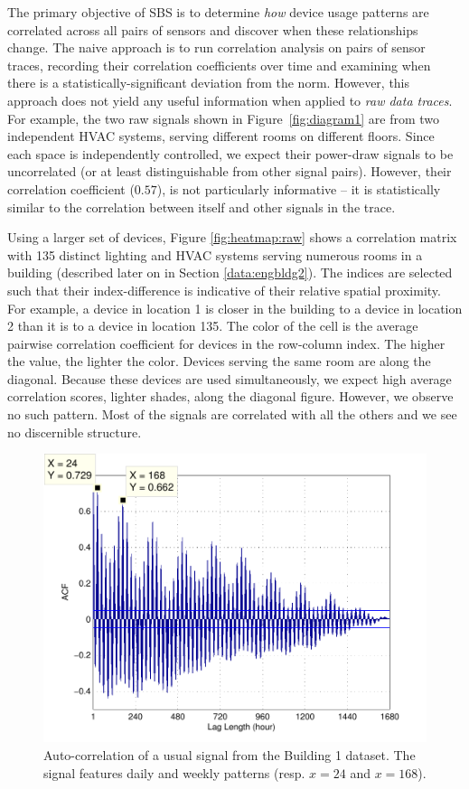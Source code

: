 The primary objective of SBS is to determine \emph{how} device usage patterns are correlated across all pairs of sensors and 
discover when these relationships change.  
The naive approach is to run correlation analysis on pairs of sensor traces, recording their correlation coefficients over time and 
examining when there is a statistically-significant deviation from the norm.  
However, this approach does not yield any useful information when applied to \emph{raw data traces}.
For example, the two raw signals shown in Figure~\ref{fig:diagram1} are from two independent HVAC systems,
 serving different rooms on different floors.
Since each space is independently controlled, we expect their power-draw signals to be uncorrelated (or at least distinguishable 
from other signal pairs).  However, their correlation coefficient ($0.57$), is not particularly informative -- it is statistically
similar to the correlation between itself and other signals in the trace.  
  
Using a larger set of devices, Figure \ref{fig:heatmap:raw} shows a correlation matrix with 135 distinct lighting and HVAC systems serving numerous rooms in a building (described later on in Section \ref{data:engbldg2}).
The indices are selected such that their index-difference is indicative of their relative spatial proximity.  
For example, a device in location 1 is closer in the building to a device in location 2 than it is to 
a device in location 135. 
The color of the cell is the average pairwise correlation coefficient for devices in the row-column index.  The higher the value, the lighter the color.
Devices serving the same room are along the diagonal.  Because these devices are used simultaneously, we expect
high average correlation scores, lighter shades, along the diagonal figure.
However, we observe no such pattern.  %
Most of the signals are correlated with all the others and we see no discernible structure.

\begin{figure}[t!]
\begin{center}
\includegraphics[width=.5\textwidth]{figs/acf_101A1_GHP-eps-converted-to.pdf}
\caption{Auto-correlation of a usual signal from the Building 1 dataset.
The signal features daily and weekly patterns (resp. $x=24$ and $x=168$).}
\label{fig:autocorr}
\end{center}
\end{figure}

